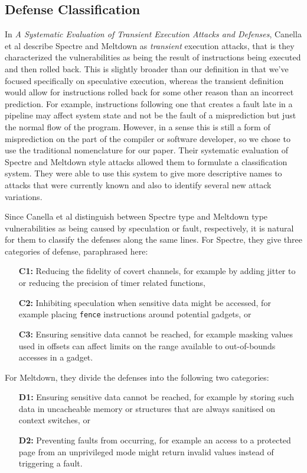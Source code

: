 \documentclass[11pt,conference]{IEEEtran}
\begin{document}
\subsection{Defense Classification}
In \textit{A Systematic Evaluation of Transient Execution Attacks and Defenses}, Canella et al\cite{canella2019} describe Spectre and Meltdown as \emph{transient} execution attacks, that is they characterized the vulnerabilities as being the result of instructions being executed and then rolled back.
This is slightly broader than our definition in that we've focused specifically on speculative execution, whereas the transient definition would allow for instructions rolled back for some other reason than an incorrect prediction.
For example, instructions following one that creates a fault late in a pipeline may affect system state and not be the fault of a misprediction but just the normal flow of the program.
However, in a sense this is still a form of misprediction on the part of the compiler or software developer, so we chose to use the traditional nomenclature for our paper.
Their systematic evaluation of Spectre and Meltdown style attacks allowed them to formulate a classification system.
They were able to use this system to give more descriptive names to attacks that were currently known and also to identify several new attack variations.

Since Canella et al distinguish between Spectre type and Meltdown type vulnerabilities as being caused by speculation or fault, respectively, it is natural for them to classify the defenses along the same lines.
For Spectre, they give three categories of defense, paraphrased here:
\begin{enumerate}
	\item[\textbf{C1:}] Reducing the fidelity of covert channels, for example by adding jitter to or reducing the precision of timer related functions,
	\item[\textbf{C2:}] Inhibiting speculation when sensitive data might be accessed, for example placing \texttt{fence} instructions around potential gadgets, or
	\item[\textbf{C3:}] Ensuring sensitive data cannot be reached, for example masking values used in offsets can affect limits on the range available to out-of-bounds accesses in a gadget.
\end{enumerate}

For Meltdown, they divide the defenses into the following two categories:
\begin{enumerate}
	\item[\textbf{D1:}] Ensuring sensitive data cannot be reached, for example by storing such data in uncacheable memory or structures that are always sanitised on context switches, or
	\item[\textbf{D2:}] Preventing faults from occurring, for example an access to a protected page from an unprivileged mode might return invalid values instead of triggering a fault.
\end{enumerate}
\end{document}
